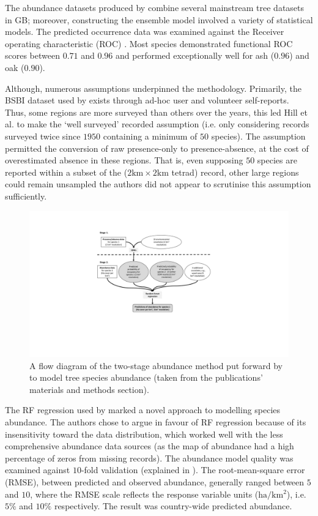 The abundance datasets produced by \cite{hill.data} combine several mainstream tree datasets in GB; moreover, 
constructing the ensemble model involved a variety of statistical models.
The predicted occurrence data was examined against the Receiver operating characteristic (ROC) \cite{jimenez2012insights}.
Most species demonstrated functional ROC scores between $0.71$ and $0.96$ and performed exceptionally
well for ash ($0.96$) and oak ($0.90$).  

Although, numerous assumptions underpinned the methodology.
Primarily, the BSBI dataset used by \cite{hill.data} exists through ad-hoc user and volunteer self-reports.
Thus, some regions are more surveyed than others over the years, this led Hill et al. to make the 
`well surveyed' recorded assumption (i.e. only considering records surveyed twice since $1950$ containing a minimum of $50$ species).
The assumption permitted the conversion of raw presence-only to presence-absence, 
at the cost of overestimated absence in these regions. That is, even supposing $50$ species
are reported within a subset of the ($\mathrm{2km \times 2km}$ tetrad) record, other large regions could remain unsampled\textemdash
the authors did not appear to scrutinise this assumption sufficiently.

\begin{figure}
    \centering
    \includegraphics[scale=0.55]{chapter2/figures/hill-method-fig.pdf}
    \caption{A flow diagram of the two-stage abundance method put forward by \cite{hill.data} to model tree species abundance  
    (taken from the publications' materials and methods section).}
    \label{fig:hill-method}
\end{figure}

The RF regression used by \cite{hill.data} marked a novel approach to modelling species abundance.
The authors chose to argue in favour of RF regression because of its insensitivity toward the data distribution,
which worked well with the less comprehensive abundance data sources (as the map of abundance had a high percentage of zeros from missing records).
The abundance model quality was examined against $10$-fold validation (explained in \cite{refaeilzadeh2009cross}).
The root-mean-square error (RMSE), between predicted and observed abundance, generally ranged between $5$ and $10$,
where the RMSE scale reflects the response variable units ($\mathrm{ha/km^2}$), i.e. $5\%$ and $10\%$ respectively.
The result was country-wide predicted abundance.

